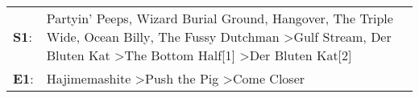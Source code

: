 \begin{supertabular}{p{0.03\textwidth}p{0.92\textwidth}}
 \textbf{S1}:  &  Partyin' Peeps\textsuperscript{}, \enspace Wizard Burial Ground\textsuperscript{}, \enspace Hangover\textsuperscript{}, \enspace The Triple Wide\textsuperscript{}, \enspace Ocean Billy\textsuperscript{}, \enspace The Fussy Dutchman\textsuperscript{} \textgreater \enspace Gulf Stream\textsuperscript{}, \enspace Der Bluten Kat\textsuperscript{} \textgreater \enspace The Bottom Half[1]\textsuperscript{} \textgreater \enspace Der Bluten Kat[2]\textsuperscript{}  \enspace  \\
 \textbf{E1}:  &                                                                                                                                                                                                                                                                                                                                       Hajimemashite\textsuperscript{} \textgreater \enspace Push the Pig\textsuperscript{} \textgreater \enspace Come Closer\textsuperscript{}  \enspace  \\
\end{supertabular}

